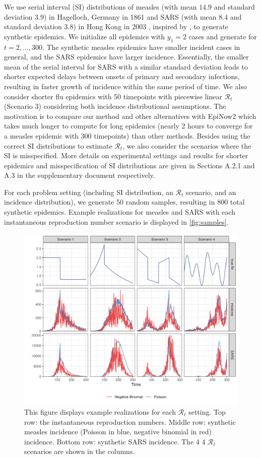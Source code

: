 \documentclass[10pt,letterpaper]{article}
\def\calR{\mathcal{R}}
\begin{document}
We use serial interval (SI) distributions of measles (with mean $14.9$ and
standard deviation $3.9$) in Hagelloch, Germany in 1861
\cite{groendyke2011bayesian} and SARS (with mean $8.4$ and standard deviation
$3.8$) in Hong Kong in 2003 \cite{lipsitch2003transmission}, inspired by
\cite{cori2013new}, to generate synthetic epidemics. We initialize all epidemics
with $y_1=2$ cases and generate for $t=2,\ldots,300$. The synthetic measles
epidemics have smaller incident cases in general, and the SARS epidemics have
larger incidence. Essentially, the smaller mean of the serial interval for SARS
with a similar standard deviation leads to shorter expected delays between
onsets of primary and secondary infections, resulting in faster growth of
incidence within the same period of time. We also consider shorter flu epidemics
with 50 timepoints with piecewise linear $\calR_t$ (Scenario 3) considering both
incidence distributional assumptions. The motivation is to compare our method
and other alternatives with EpiNow2 which takes much longer to compute for long
epidemics (nearly 2 hours to converge for a measles epidemic with 300
timepoints) than other methods. Besides using the correct SI distributions to
estimate $\calR_t$, we also consider the scenarios where the SI is misspecified.
More details on experimental settings and results for shorter epidemics and
misspecification of SI distributions are given in Sections A.2.1 and A.3 in the
supplementary document respectively. 

For each problem setting (including SI distribution, an $\calR_t$ scenario, and
an incidence distribution), we generate 50 random samples, resulting in $800$
total synthetic epidemics. Example realizations for measles and SARS with each
instantaneous reproduction number scenario is displayed in
\autoref{fig:samples}. 

\begin{figure}[!t]
  \centering
  \includegraphics[width=.9\linewidth]{fig/fig_samples.png}
  \caption{This figure displays example realizations for each $\calR_t$ setting.
  Top row: the instantaneous reproduction numbers. Middle row: synthetic measles
  incidence (Poisson in blue, negative binomial in red) incidence. Bottom row:
  synthetic SARS incidence. The 4 4 $\calR_t$ scenarios are shown in the
  columns.} 
  \label{fig:samples}
\end{figure}
\end{document}
